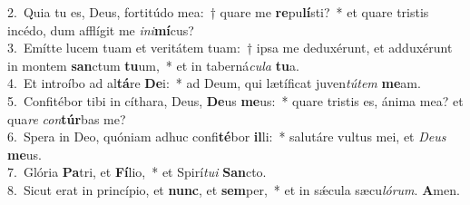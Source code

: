 {2.~}Quia tu es, Deus, fortitúdo mea:~† quare me \textbf{re}pu\textbf{lí}sti?~* et quare tristis incédo, dum afflígit me \textit{i}\textit{ni}\textbf{mí}cus?\\
{3.~}Emítte lucem tuam et veritátem tuam:~† ipsa me deduxérunt, et adduxérunt in montem \textbf{san}ctum \textbf{tu}um,~* et in taberná\textit{cu}\textit{la} \textbf{tu}a.\\
{4.~}Et introíbo ad al\textbf{tá}re \textbf{De}i:~* ad Deum, qui lætíficat juven\textit{tú}\textit{tem} \textbf{me}am.\\
{5.~}Confitébor tibi in cíthara, Deus, \textbf{De}us \textbf{me}us:~* quare tristis es, ánima mea? et qua\textit{re} \textit{con}\textbf{túr}bas me?\\
{6.~}Spera in Deo, quóniam adhuc confi\textbf{té}bor \textbf{il}li:~* salutáre vultus mei, et \textit{De}\textit{us} \textbf{me}us.\\
{7.~}Glória \textbf{Pa}tri, et \textbf{Fí}lio,~* et Spirí\textit{tu}\textit{i} \textbf{San}cto.\\
{8.~}Sicut erat in princípio, et \textbf{nunc}, et \textbf{sem}per,~* et in sǽcula sæcu\textit{ló}\textit{rum}. \textbf{A}men.\\
